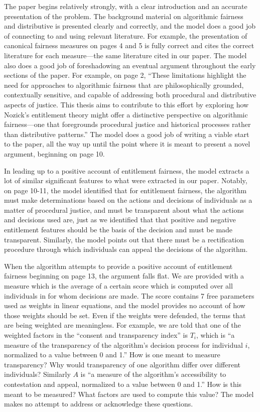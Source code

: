 The paper begins relatively strongly, with a clear introduction and an accurate
presentation of the problem. The background material on algorithmic fairness and
distributive is presented clearly and correctly, and the model does a good job
of connecting to and using relevant literature. For example, the presentation of
canonical fairness measures on pages 4 and 5 is fully correct and cites the
correct literature for each measure—the same literature cited in our paper. The
model also does a good job of foreshadowing an eventual argument throughout the
early sections of the paper. For example, on page 2, ``These limitations highlight
the need for approaches to algorithmic fairness that are philosophically
grounded, contextually sensitive, and capable of addressing both procedural and
distributive aspects of justice. This thesis aims to contribute to this effort
by exploring how Nozick’s entitlement theory might offer a distinctive
perspective on algorithmic fairness—one that foregrounds procedural justice and
historical processes rather than distributive patterns.''  The model does a good
job of writing a viable start to the paper, all the way up until the point where
it is meant to present a novel argument, beginning on page 10.

In leading up to a positive account of entitlement fairness, the model extracts
a lot of similar significant features to what were extracted in our paper.
Notably, on page 10-11, the model identified that for entitlement fairness,
the algorithm must make determinations based on the actions and decisions of
individuals as a matter of procedural justice, and must be transparent about
what the actions and decisions used are, just as we identified that that
positive and negative entitlement features should be the basis of the decision
and must be made transparent. Similarly, the model points out that there must be
a rectification procedure through which individuals can appeal the decisions of
the algorithm.

When the algorithm attempts to provide a positive account of entitlement
fairness beginning on page 13, the argument falls flat. We are provided with a
measure which is the average of a certain score which is computed over all
individuals in for whom decisions are made. The score contains 7 free parameters
used as weights in linear equations, and the model provides no account of how
those weights should be set. Even if the weights were defended, the terms that
are being weighted are meaningless. For example, we are told that one of the
weighted factors in the ``consent and transparency index'' is $T_i$, which is
``a measure of the transparency of the algorithm's decision process for
individual $i$, normalized to a value between 0 and 1.'' How is one meant to
measure transparency? Why would transparency of one algorithm differ over
different individuals? Similarly $A$ is ``a measure of the algorithm's
accessibility to contestation and appeal, normalized to a value between 0 and
1.'' How is this meant to be measured? What factors are used to compute this
value? The model makes no attempt to address or acknowledge these questions. 

